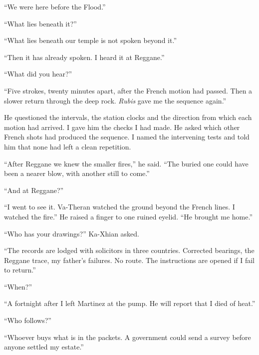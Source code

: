 ``We were here before the Flood.''\par

``What lies beneath it?''\par

``What lies beneath our temple is not spoken beyond it.''\par

``Then it has already spoken. I heard it at Reggane.''\par

``What did you hear?''\par

``Five strokes, twenty minutes apart, after the French motion had passed. Then a slower return through the deep rock. \emph{Rubis} gave me the sequence again.''\par

He questioned the intervals, the station clocks and the direction from which each motion had arrived. I gave him the checks I had made. He asked which other French shots had produced the sequence. I named the intervening tests and told him that none had left a clean repetition.\par

``After Reggane we knew the smaller fires,'' he said. ``The buried one could have been a nearer blow, with another still to come.''\par

``And at Reggane?''\par

``I went to see it. Va-Theran watched the ground beyond the French lines. I watched the fire.'' He raised a finger to one ruined eyelid. ``He brought me home.''\par

``Who has your drawings?'' Ka-Xhian asked.\par

``The records are lodged with solicitors in three countries. Corrected bearings, the Reggane trace, my father's failures. No route. The instructions are opened if I fail to return.''\par

``When?''\par

``A fortnight after I left Martinez at the pump. He will report that I died of heat.''\par

``Who follows?''\par

``Whoever buys what is in the packets. A government could send a survey before anyone settled my estate.''\par

